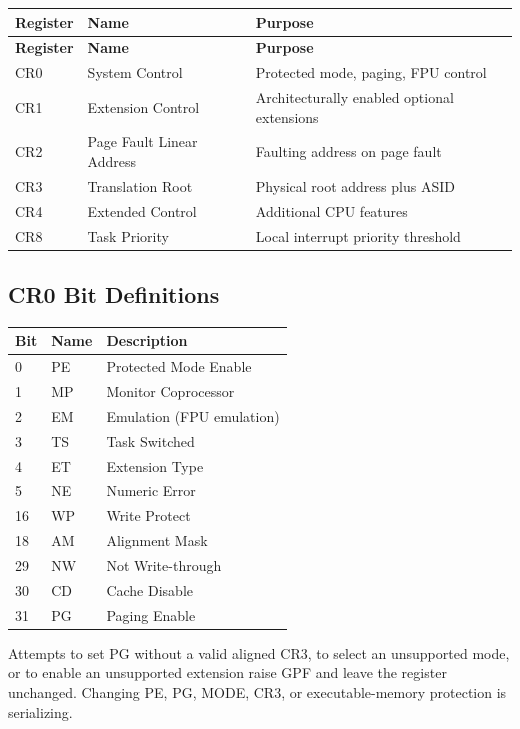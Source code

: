 \documentclass[11pt]{article}
\begin{document}
\begin{longtable}{@{}lll@{}}
\toprule
\textbf{Register} & \textbf{Name} & \textbf{Purpose} \\ \midrule
\endfirsthead
\toprule
\textbf{Register} & \textbf{Name} & \textbf{Purpose} \\ \midrule
\endhead
CR0 & System Control & Protected mode, paging, FPU control \\
CR1 & Extension Control & Architecturally enabled optional extensions \\
CR2 & Page Fault Linear Address & Faulting address on page fault \\
CR3 & Translation Root & Physical root address plus ASID \\
CR4 & Extended Control & Additional CPU features \\
CR8 & Task Priority & Local interrupt priority threshold \\ \bottomrule
\end{longtable}

\subsection{CR0 Bit Definitions}

\begin{table}[h]
\centering
\begin{tabular}{@{}lll@{}}
\toprule
\textbf{Bit} & \textbf{Name} & \textbf{Description} \\ \midrule
0 & PE & Protected Mode Enable \\
1 & MP & Monitor Coprocessor \\
2 & EM & Emulation (FPU emulation) \\
3 & TS & Task Switched \\
4 & ET & Extension Type \\
5 & NE & Numeric Error \\
16 & WP & Write Protect \\
18 & AM & Alignment Mask \\
29 & NW & Not Write-through \\
30 & CD & Cache Disable \\
31 & PG & Paging Enable \\ \bottomrule
\end{tabular}
\end{table}

Attempts to set PG without a valid aligned CR3, to select an unsupported mode, or to enable an unsupported extension raise GPF and leave the register unchanged. Changing PE, PG, MODE, CR3, or executable-memory protection is serializing.
\end{document}
